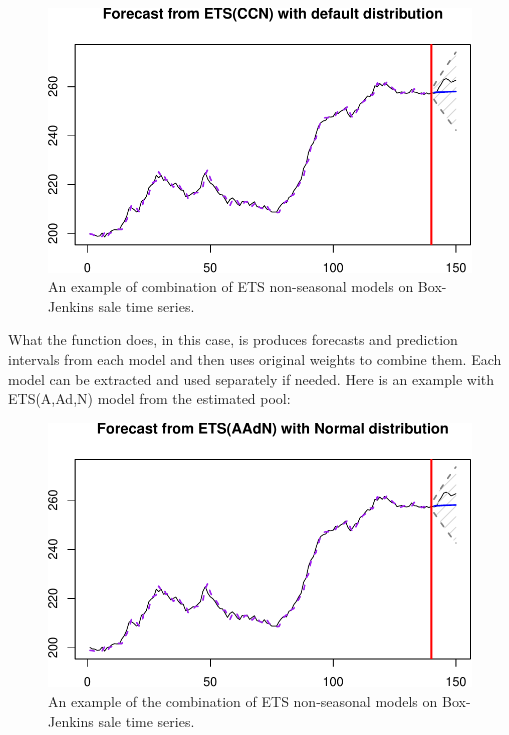 \documentclass[]{book}
\newenvironment{Shaded}{\begin{snugshade}}{\end{snugshade}}
\newcommand{\DataTypeTok}[1]{\textcolor[rgb]{0.13,0.29,0.53}{#1}}
\newcommand{\DecValTok}[1]{\textcolor[rgb]{0.00,0.00,0.81}{#1}}
\newcommand{\KeywordTok}[1]{\textcolor[rgb]{0.13,0.29,0.53}{\textbf{#1}}}
\newcommand{\NormalTok}[1]{#1}
\newcommand{\OperatorTok}[1]{\textcolor[rgb]{0.81,0.36,0.00}{\textbf{#1}}}
\newcommand{\StringTok}[1]{\textcolor[rgb]{0.31,0.60,0.02}{#1}}
\theoremstyle{definition}
\theoremstyle{definition}
\theoremstyle{definition}
\theoremstyle{definition}
\theoremstyle{remark}
\begin{document}
\begin{figure}
\centering
\includegraphics{Svetunkov--2022----ADAM_files/figure-latex/adamETSCCN-1.pdf}
\caption{\label{fig:adamETSCCN}An example of combination of ETS non-seasonal models on Box-Jenkins sale time series.}
\end{figure}

What the function does, in this case, is produces forecasts and prediction intervals from each model and then uses original weights to combine them. Each model can be extracted and used separately if needed. Here is an example with ETS(A,Ad,N) model from the estimated pool:

\begin{Shaded}
\end{Shaded}

\begin{figure}
\centering
\includegraphics{Svetunkov--2022----ADAM_files/figure-latex/adamETSCCNAAdN-1.pdf}
\caption{\label{fig:adamETSCCNAAdN}An example of the combination of ETS non-seasonal models on Box-Jenkins sale time series.}
\end{figure}
\end{document}
